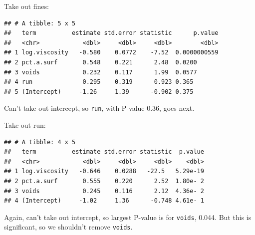 \documentclass[ignorenonframetext,]{beamer}
\newenvironment{Shaded}{\begin{snugshade}}{\end{snugshade}}
\newcommand{\FloatTok}[1]{\textcolor[rgb]{0.00,0.00,0.81}{#1}}
\newcommand{\KeywordTok}[1]{\textcolor[rgb]{0.13,0.29,0.53}{\textbf{#1}}}
\newcommand{\NormalTok}[1]{#1}
\newcommand{\OperatorTok}[1]{\textcolor[rgb]{0.81,0.36,0.00}{\textbf{#1}}}
\newcommand{\StringTok}[1]{\textcolor[rgb]{0.31,0.60,0.02}{#1}}
\begin{document}
\begin{frame}[fragile]{Take out fines:}
\protect\hypertarget{take-out-fines}{}

\begin{Shaded}
\end{Shaded}

\begin{verbatim}
## # A tibble: 5 x 5
##   term          estimate std.error statistic      p.value
##   <chr>            <dbl>     <dbl>     <dbl>        <dbl>
## 1 log.viscosity   -0.580    0.0772    -7.52  0.0000000559
## 2 pct.a.surf       0.548    0.221      2.48  0.0200      
## 3 voids            0.232    0.117      1.99  0.0577      
## 4 run              0.295    0.319      0.923 0.365       
## 5 (Intercept)     -1.26     1.39      -0.902 0.375
\end{verbatim}

Can't take out intercept, so \texttt{run}, with P-value 0.36, goes next.

\end{frame}

\begin{frame}[fragile]{Take out run:}
\protect\hypertarget{take-out-run}{}

\begin{Shaded}
\end{Shaded}

\begin{verbatim}
## # A tibble: 4 x 5
##   term          estimate std.error statistic  p.value
##   <chr>            <dbl>     <dbl>     <dbl>    <dbl>
## 1 log.viscosity   -0.646    0.0288   -22.5   5.29e-19
## 2 pct.a.surf       0.555    0.220      2.52  1.80e- 2
## 3 voids            0.245    0.116      2.12  4.36e- 2
## 4 (Intercept)     -1.02     1.36      -0.748 4.61e- 1
\end{verbatim}

Again, can't take out intercept, so largest P-value is for
\texttt{voids}, 0.044. But this is significant, so we shouldn't remove
\texttt{voids}.

\end{frame}
\end{document}

